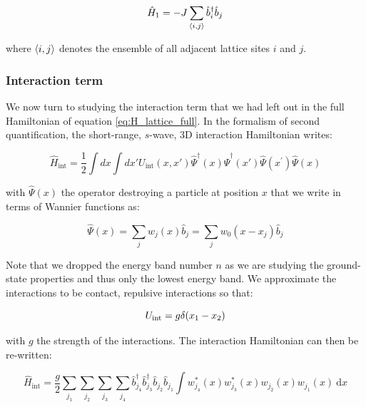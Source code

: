 \begin{equation}
    \hat{H}_1 = -J \sum_{\left\langle i,j\right\rangle} \hat{b}^{\dagger}_i \hat{b}_j
    \label{eq:H_band}
\end{equation}

\noindent where $\left\langle i,j\right\rangle$ denotes the ensemble of all adjacent lattice sites $i$ and $j$.

\subsubsection{Interaction term}
We now turn to studying the interaction term that we had left out in the full Hamiltonian of equation \ref{eq:H_lattice_full}. In the formalism of second quantification, the short-range, $s$-wave, 3D interaction Hamiltonian writes:

\begin{equation}
    \hat{H}_{\mathrm{int}}=\frac{1}{2} \int d x \int d x' U_{\mathrm{int}}\left(x, x'\right) \hat{\Psi}^{\dagger}(x) \hat{\Psi}^{\dagger}\left(x'\right) \hat{\Psi}\left(x^{\prime}\right) \hat{\Psi}(x)
\end{equation}

\noindent with $\hat{\Psi}(x)$ the operator destroying a particle at position $x$ that we write in terms of Wannier functions as:

\begin{equation}
    \hat{\Psi}(x)=\sum_{j} w_{j}(x) \hat{b}_{j} = \sum_{j} w_{0}(x-x_j) \hat{b}_{j} 
    \label{eq:atom_operator_lattice}
\end{equation}

\noindent Note that we dropped the energy band number $n$ as we are studying the ground-state properties and thus only the lowest energy band. We approximate the interactions to be contact, repulsive interactions so that:

\begin{equation}
    U_{\rm{int}}= g \delta (x_1 - x_2)
\end{equation}

\noindent with $g$ the strength of the interactions. The interaction Hamiltonian can then be re-written:

\begin{equation}
    \hat{H}_{\mathrm{int}}=\frac{g}{2} \sum_{j_{1}} \sum_{j_{2}} \sum_{j_{3}} \sum_{j_{4}} \hat{b}_{j_{4}}^{\dagger} \hat{b}_{j_{3}}^{\dagger} \hat{b}_{j_{2}} \hat{b}_{j_{1}} \int w_{j_{4}}^{*}(x) w_{j_{3}}^{*}(x) w_{j_{2}}(x) w_{j_{1}}(x) \mathrm{~d} x
    \label{eq:h_int_intermediate}
\end{equation}

